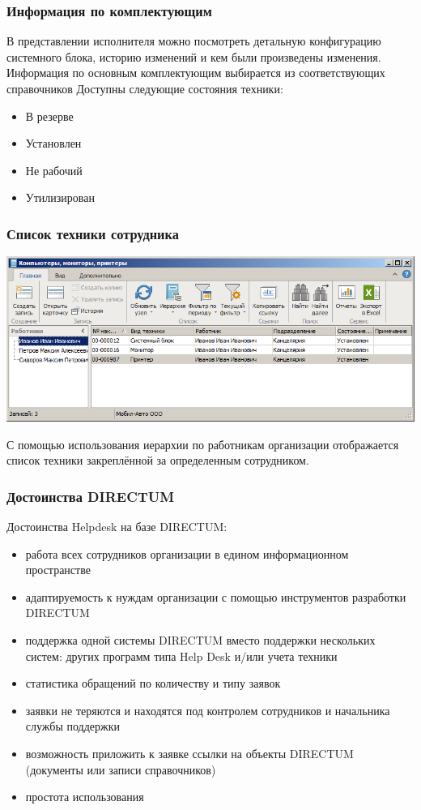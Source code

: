 \documentclass{../industrial-development}
\begin{document}
\begin{frame} \frametitle{Информация по комплектующим}
В представлении исполнителя можно посмотреть детальную конфигурацию системного блока, историю изменений и кем были произведены изменения. Информация по основным комплектующим выбирается из соответствующих справочников 
\newline
	Доступны следующие состояния техники:
	\begin{itemize}
		\item В резерве
		\item Установлен
		\item Не рабочий
		\item Утилизирован
	\end{itemize}
	
\end{frame}
\lecturenotes

\begin{frame} \frametitle{Список техники сотрудника}
\centerline{\includegraphics[width=\textwidth]{pic9.png}}
\end{frame}
\lecturenotes
С помощью использования иерархии по работникам организации отображается список техники закреплённой за определенным сотрудником.

\begin{frame} \frametitle{Достоинства DIRECTUM}
Достоинства Helpdesk на базе DIRECTUM:
	\begin{itemize}
		\item работа всех сотрудников организации в едином информационном пространстве
		\item адаптируемость к нуждам организации с помощью инструментов разработки DIRECTUM
		\item поддержка одной системы DIRECTUM вместо поддержки нескольких систем: других программ типа Help Desk и/или учета техники
		\item статистика обращений по количеству и типу заявок
		\item заявки не теряются и находятся под контролем сотрудников и начальника службы поддержки
		\item возможность приложить к заявке ссылки на объекты DIRECTUM (документы или записи справочников)
		\item простота использования
	\end{itemize}
\end{frame}
\lecturenotes
\end{document}
